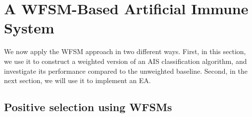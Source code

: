 \documentclass{llncs}
\begin{document}





\section{A WFSM-Based Artificial Immune System}

\label{sectionweightedrep}

We now apply the WFSM approach in two different ways. First, in this section, we use it
to construct a weighted version of an AIS classification algorithm, and investigate its
performance compared to the unweighted baseline. Second, in the next section, we will use
it to implement an EA.

\subsection{Positive selection using WFSMs}
\end{document}
